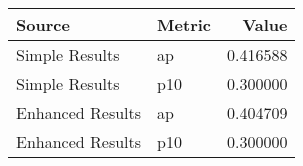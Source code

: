 \begin{tabular}{llr}
\toprule
Source & Metric & Value \\
\midrule
Simple Results & ap & 0.416588 \\
Simple Results & p10 & 0.300000 \\
Enhanced Results & ap & 0.404709 \\
Enhanced Results & p10 & 0.300000 \\
\bottomrule
\end{tabular}
